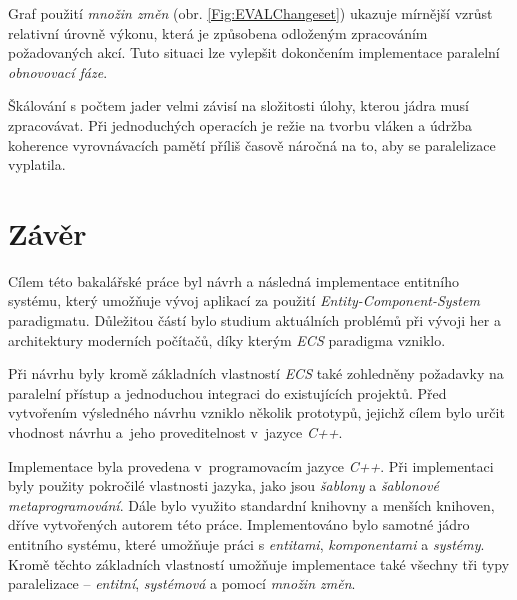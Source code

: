 Graf použití \emph{množin změn} (obr. \ref{Fig:EVALChangeset}) ukazuje mírnější vzrůst relativní úrovně výkonu, která je způsobena odloženým zpracováním požadovaných akcí. Tuto situaci lze vylepšit dokončením implementace paralelní \emph{obnovovací fáze}.

Škálování s počtem jader velmi závisí na složitosti úlohy, kterou jádra musí zpracovávat. Při jednoduchých operacích je režie na tvorbu vláken a údržba koherence vyrovnávacích pamětí příliš časově náročná na to, aby se paralelizace vyplatila.

\chapter{Závěr}

Cílem této bakalářské práce byl návrh a následná implementace entitního systému, který umožňuje vývoj aplikací za použití \emph{Entity-Component-System} paradigmatu. Důležitou částí bylo studium aktuálních problémů při vývoji her a architektury moderních počítačů, díky kterým \emph{ECS} paradigma vzniklo. 

Při návrhu byly kromě základních vlastností \emph{ECS} také zohledněny požadavky na paralelní přístup a jednoduchou integraci do existujících projektů. Před vytvořením výsledného návrhu vzniklo několik prototypů, jejichž cílem bylo určit vhodnost návrhu a~jeho proveditelnost v~jazyce \emph{C++}. 


Implementace byla provedena v~programovacím jazyce \emph{C++}. Při implementaci byly použity pokročilé vlastnosti jazyka, jako jsou \emph{šablony} a \emph{šablonové metaprogramování}. Dále bylo využito standardní knihovny a menších knihoven, dříve vytvořených autorem této práce. Implementováno bylo samotné jádro entitního systému, které umožňuje práci s \emph{entitami}, \emph{komponentami} a \emph{systémy}. Kromě těchto základních vlastností umožňuje implementace také všechny tři typy paralelizace -- \emph{entitní}, \emph{systémová} a pomocí \emph{množin změn}. 

